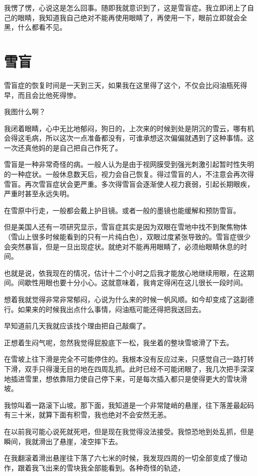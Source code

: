 我愣了愣，心说这是怎么回事。随即我就意识到了，这是雪盲症。我立即闭上了自己的眼睛，我知道我自己绝对不能再使用眼睛了，再使用一下，眼前立即就会全黑，什么都看不见。

\chapter{雪盲}

雪盲症的恢复时间是一天到三天，如果我在这里得了这个，不仅会比闷油瓶死得早，而且会比他死得惨。

我图什么啊？

我闭着眼睛，心中无比地郁闷，狗日的，上次来的时候到处是阴沉的雪云，哪有机会得这毛病，所以这次一点准备都没有，可谁承想这次偏偏就遇到了这种事情。这一次还真他妈的是自己把自己作死了。

雪盲是一种非常奇怪的病。一般人认为是由于视网膜受到强光刺激引起暂时性失明的一种症状。一般休息数天后，视力会自己恢复。得过雪盲的人，不注意会再次得雪盲。再次雪盲症状会更严重。多次得雪盲会逐渐使人视力衰弱，引起长期眼疾，严重时甚至永远失明。

在雪原中行走，一般都会戴上护目镜。或者一般的墨镜也能缓解和预防雪盲。

但是美国人还有一项研究显示，雪盲症其实是因为双眼在雪地中找不到聚焦物体（雪山上很多时候能看到的只有一片纯白色），双眼过度紧张导致的。雪盲症很少会突然暴盲，但是一旦出现症状。就绝对不能再用眼睛了，必须绐眼睛休息的时间。

也就是说，依我现在的情况，估计十二个小时之后我才能放心地继续用眼，在这期间。间歇性用眼也要十分小心。这就意味着，我肯定得闲在这儿很长一段时间。

想着我就觉得非常非常郁闷，心说为什么来的时候一帆风顺。如今却变成了这副德行。如果来的时候我出点什么事情，闷油瓶可能还得把我送回去。

早知道前几天我就应该找个理由把自己敲瘸了。

正想着生闷气呢，忽然我觉得屁股底下一松，我坐着的整块雪坡滑了下去。

在雪坡上往下滑是完全不可能停住的。我根本没有反应过来，只感觉自己一路打转下滑，双手只得漫无目的地在四周乱抓。此时已经不可能闭眼了，我几次把手深深地插进雪里，想依靠阻力使自己停下来，可是每次插入都只是使得更大的雪块滑坡。

我惊叫着一路滚下山坡。那下面，我知道是一个非常陡峭的悬崖，往下落差最起码有三十米，就算下面有积雪，我也绝对不会安然无恙。

在以前我可能心说死就死吧，但是现在我觉得没法接受。我惊恐地到处乱抓，但是瞬间，我就滑出了悬崖，凌空摔下去。

在我翻滚着滑出悬崖往下落了六七米的时候，我发现四周的一切全部变成了慢动作，跟着我飞出来的雪块我全部能看到。各种奇怪的轨迹，

